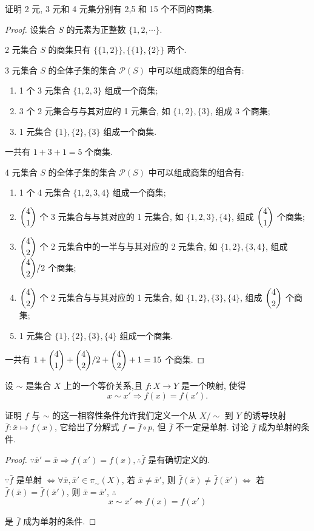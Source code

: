 \documentclass{ctexart}
\begin{document}
\begin{exercise}%
    证明 2 元, 3 元和 4 元集分别有 2,5 和 15 个不同的商集.
\end{exercise}
\begin{proof}
    设集合 $S$ 的元素为正整数 $\{1,2,\cdots\}$.

    2 元集合 $S$ 的商集只有 $\{\{1,2\}\},\{\{1\},\{2\}\}$ 两个.

    3 元集合 $S$ 的全体子集的集合 $\mathcal{P}(S)$ 中可以组成商集的组合有:
    \begin{enumerate}
        \item 1 个 3 元集合 $\{1,2,3\}$ 组成一个商集;
        \item 3 个 2 元集合与与其对应的 1 元集合, 如 $\{1,2\},\{3\}$, 组成 3 个商集;
        \item 1 元集合 $\{1\},\{2\},\{3\}$ 组成一个商集.
    \end{enumerate}

    一共有 $1+3+1=5$ 个商集.

    4 元集合 $S$ 的全体子集的集合 $\mathcal{P}(S)$ 中可以组成商集的组合有:
    \begin{enumerate}
        \item 1 个 4 元集合 $\{1,2,3,4\}$ 组成一个商集;
        \item $\dbinom{4}{1}$ 个 3 元集合与与其对应的 1 元集合, 如 $\{1,2,3\},\{4\}$, 组成 $\dbinom{4}{1}$ 个商集;
        \item $\dbinom{4}{2}$ 个 2 元集合中的一半与与其对应的 2 元集合, 如 $\{1,2\},\{3,4\}$, 组成 $\dbinom{4}{2}/2$ 个商集;
        \item $\dbinom{4}{2}$ 个 2 元集合与与其对应的 1 元集合, 如 $\{1,2\},\{3\},\{4\}$, 组成 $\dbinom{4}{2}$ 个商集;
        \item 1 元集合 $\{1\},\{2\},\{3\},\{4\}$ 组成一个商集.
    \end{enumerate}

    一共有 $1+\dbinom{4}{1}+\dbinom{4}{2}/2+\dbinom{4}{2}+1=15$ 个商集.
\end{proof}
\begin{exercise}%
    设 $\sim$ 是集合 $X$ 上的一个等价关系,且 $f:X\to Y$ 是一个映射, 使得
    \[x\sim x'\Rightarrow f(x)=f(x').\]

    证明 $f$ 与 $\sim$ 的这一相容性条件允许我们定义一个从 $X/\sim$ 到 $Y$ 的诱导映射 $\bar{f}:\bar{x}\mapsto f(x)$, 它给出了分解式 $f=\bar{f}\circ p$, 但 $\bar{f}$ 不一定是单射. 讨论 $\bar{f}$ 成为单射的条件.
\end{exercise}
\begin{proof}
    $\because\bar{x}'=\bar{x}\Rightarrow f(x')=f(x),\therefore\bar{f}$ 是有确切定义的.

    $\because\bar{f}$ 是单射 $\Leftrightarrow\forall\bar{x},\bar{x}'\in\pi_\sim(X)$, 若 $\bar{x}\neq\bar{x}'$, 则 $\bar{f}(\bar{x})\neq\bar{f}(\bar{x}')\Leftrightarrow$ 若 $\bar{f}(\bar{x})=\bar{f}(\bar{x}')$, 则 $\bar{x}=\bar{x}'$, $\therefore$
    \[x\sim x'\Leftrightarrow f(x)=f(x')\]

    是 $\bar{f}$ 成为单射的条件.
\end{proof}
\end{document}
